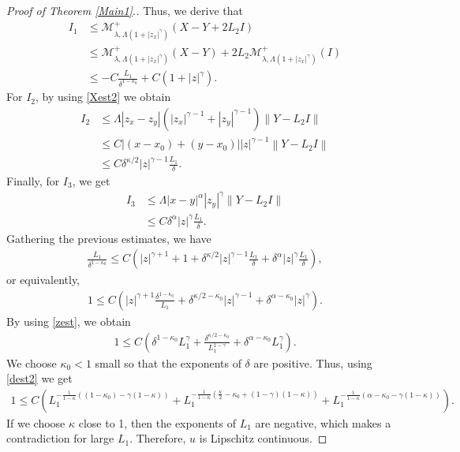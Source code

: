\documentclass[reqno]{amsart}
\theoremstyle{plain}
\theoremstyle{definition}
\theoremstyle{remark}
\newcommand{\norm}[1]{\left\lVert#1\right\rVert}
\numberwithin{equation}{section}
\begin{document}
\begin{proof}[Proof of Theorem \ref{Main1}.]
     Thus, we derive that
     \begin{align*}
         I_1 &\leq \mathcal{M}^+_{\lambda, \Lambda(1+|z_x|^{\gamma})}(X-Y+2L_2I) \\
         &\leq \mathcal{M}^+_{\lambda, \Lambda(1+|z_x|^{\gamma})}(X-Y) +2L_2\mathcal{M}^+_{\lambda, \Lambda(1+|z_x|^{\gamma})}(I)\\
         &\leq -C\frac{L_1}{\delta^{1-\kappa_0}} + C(1+|z|^\gamma).
     \end{align*}
     For $I_2$, by using \eqref{Xest2} we obtain
     \begin{align*}
         I_2 &\leq \Lambda|z_x-z_y|(|z_x|^{\gamma-1}+|z_y|^{\gamma-1}) \norm{Y-L_2I} \\
         &\leq C|(x-x_0)+(y-x_0)||z|^{\gamma-1}\norm{Y-L_2I} \\
         &\leq C\delta^{\kappa/2}|z|^{\gamma-1}\frac{L_1}{\delta}.
     \end{align*}
     Finally, for $I_3$, we get
     \begin{align*}
         I_3 &\leq \Lambda|x-y|^\alpha|z_y|^\gamma \norm{Y-L_2I} \\
         &\leq C\delta^\alpha |z|^{\gamma}\frac{L_1}{\delta}.
     \end{align*}
     Gathering the previous estimates, we have
     \begin{align*}
         \frac{L_1}{\delta^{1-\kappa_0}} \leq C\left(|z|^{\gamma+1}+1 + \delta^{\kappa/2}|z|^{\gamma-1}\frac{L_1}{\delta} + \delta^\alpha |z|^{\gamma}\frac{L_1}{\delta}\right),
     \end{align*}
          or equivalently,
     \begin{align*}
         1 \leq C\left(|z|^{\gamma+1} \frac{\delta^{1-\kappa_0}}{L_1} + \delta^{\kappa/2-\kappa_0}|z|^{\gamma-1} + \delta^{\alpha-\kappa_0} |z|^{\gamma}\right).
     \end{align*}
     By using \eqref{zest}, we obtain
     \begin{align*}
         1 \leq C\left( \delta^{1-\kappa_0 }{L_1^{\gamma}} + \frac{\delta^{\kappa/2-\kappa_0}}{L_1^{1-\gamma}} + \delta^{\alpha-\kappa_0} L_1^{\gamma} \right).
     \end{align*}
     We choose $\kappa_0<1$ small so that the exponents of $\delta$ are positive.
     Thus, using \eqref{dest2} we get
     \begin{align*}
         1 \leq C\left( L_1^{-\frac{1}{1-\kappa}\left((1-\kappa_0) -\gamma(1-\kappa)\right) }+L_1^{-\frac{1}{1-\kappa}\left(\frac{\kappa}{2} - \kappa_0 + (1-\gamma)(1-\kappa)\right)} + L_1^{-\frac{1}{1-\kappa}(\alpha - \kappa_0 - \gamma(1-\kappa))} \right).
     \end{align*}
     If we choose $\kappa$ close to 1, then the exponents of $L_1$ are negative, which makes a contradiction for large $L_1$.
     Therefore, $u$ is Lipschitz continuous.
\end{proof}
\end{document}
